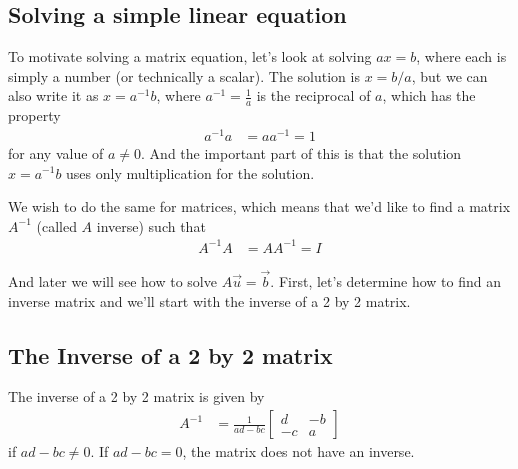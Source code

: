 \subsection{Solving a simple linear equation}

To motivate solving a matrix equation, let's look at solving $a x = b$, where each is simply a number (or technically a scalar).   The solution is $x=b/a$, but we can also write it as $x = a^{-1}b$, where $a^{-1}=\frac{1}{a}$ is the reciprocal of $a$, which has the property 
%
\begin{align*}
a^{-1} a & = a a^{-1} = 1
\end{align*}
for any value of $a \neq 0$.  And the important part of this is that the solution $x=a^{-1}b$ uses only multiplication for the solution. 

We wish to do the same for matrices, which means that we'd like to find a matrix $A^{-1}$ (called $A$ inverse)  such that 
%
\begin{align*}
A^{-1} A &  = A A^{-1} = I 
\end{align*}

And later we will see how to solve $A\vec{u}=\vec{b}$.  First, let's determine how to find an inverse matrix and we'll start with the inverse of a 2 by 2 matrix. 

\subsection{The Inverse of a 2 by 2 matrix}


\begin{Boxed*}
The inverse of a 2 by 2 matrix is given by 
%
\begin{align}
A^{-1} & = \frac{1}{ad-bc}
\begin{bmatrix}
d & -b \\ -c & a 
\end{bmatrix} \label{eq:def:2by2:inverse}
\end{align}
%
if $ad-bc \neq 0$.  If $ad-bc =0$, the matrix does not have an inverse.
\end{Boxed*}

